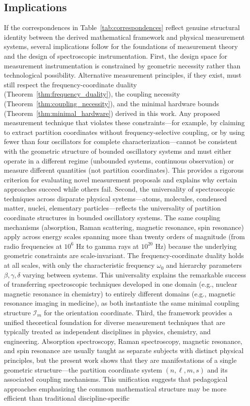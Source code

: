 \documentclass[twocolumn,10pt,a4paper]{article}
\theoremstyle{remark}
\begin{document}
\subsection{Implications}

If the correspondences in Table~\ref{tab:correspondences} reflect genuine structural identity between the derived mathematical framework and physical measurement systems, several implications follow for the foundations of measurement theory and the design of spectroscopic instrumentation. First, the design space for measurement instrumentation is constrained by geometric necessity rather than technological possibility. Alternative measurement principles, if they exist, must still respect the frequency-coordinate duality (Theorem~\ref{thm:frequency_duality}), the coupling necessity (Theorem~\ref{thm:coupling_necessity}), and the minimal hardware bounds (Theorem~\ref{thm:minimal_hardware}) derived in this work. Any proposed measurement technique that violates these constraints—for example, by claiming to extract partition coordinates without frequency-selective coupling, or by using fewer than four oscillators for complete characterization—cannot be consistent with the geometric structure of bounded oscillatory systems and must either operate in a different regime (unbounded systems, continuous observation) or measure different quantities (not partition coordinates). This provides a rigorous criterion for evaluating novel measurement proposals and explains why certain approaches succeed while others fail. Second, the universality of spectroscopic techniques across disparate physical systems—atoms, molecules, condensed matter, nuclei, elementary particles—reflects the universality of partition coordinate structures in bounded oscillatory systems. The same coupling mechanisms (absorption, Raman scattering, magnetic resonance, spin resonance) apply across energy scales spanning more than twenty orders of magnitude (from radio frequencies at $10^6$ Hz to gamma rays at $10^{20}$ Hz) because the underlying geometric constraints are scale-invariant. The frequency-coordinate duality holds at all scales, with only the characteristic frequency $\omega_0$ and hierarchy parameters $\beta, \gamma, \delta$ varying between systems. This universality explains the remarkable success of transferring spectroscopic techniques developed in one domain (e.g., nuclear magnetic resonance in chemistry) to entirely different domains (e.g., magnetic resonance imaging in medicine), as both instantiate the same minimal coupling structure $\mathcal{I}_m$ for the orientation coordinate. Third, the framework provides a unified theoretical foundation for diverse measurement techniques that are typically treated as independent disciplines in physics, chemistry, and engineering. Absorption spectroscopy, Raman spectroscopy, magnetic resonance, and spin resonance are usually taught as separate subjects with distinct physical principles, but the present work shows that they are manifestations of a single geometric structure—the partition coordinate system $(n, \ell, m, s)$ and its associated coupling mechanisms. This unification suggests that pedagogical approaches emphasizing the common mathematical structure may be more efficient than traditional discipline-specific 
\end{document}
